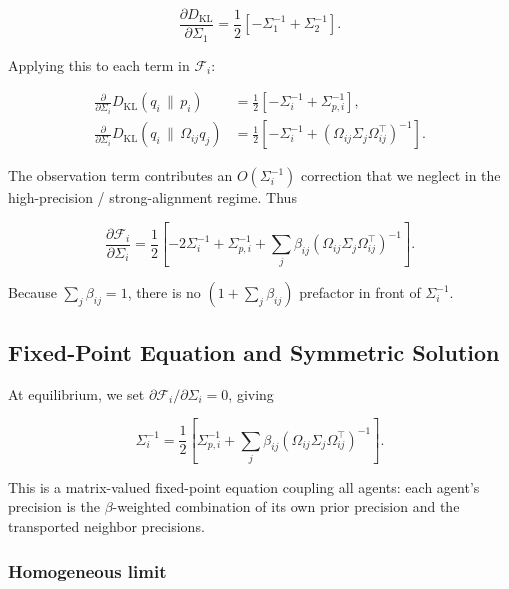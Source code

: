 \documentclass[11pt]{article}
\begin{document}
\begin{equation}
\frac{\partial D_{\mathrm{KL}}}{\partial \Sigma_1}
=\frac{1}{2}\left[
-\Sigma_1^{-1}
+ \Sigma_2^{-1}
\right].
\end{equation}

Applying this to each term in $\mathcal{F}_i$:

\begin{align}
\frac{\partial}{\partial \Sigma_i}
D_{\mathrm{KL}}(q_i \,\|\, p_i)
&=\frac{1}{2}\left[
-\Sigma_i^{-1}
+ \Sigma_{p,i}^{-1}
\right],
\\[6pt]
\frac{\partial}{\partial \Sigma_i}
D_{\mathrm{KL}}(q_i \,\|\, \Omega_{ij} q_j)
&=
\frac{1}{2}\left[
-\Sigma_i^{-1}
+ (\Omega_{ij}\Sigma_j\Omega_{ij}^\top)^{-1}
\right].
\end{align}

The observation term contributes an $O(\Sigma_i^{-1})$ correction that we neglect in the high-precision / strong-alignment regime. Thus

\begin{equation}
\boxed{
\frac{\partial \mathcal{F}_i}{\partial \Sigma_i}
=\frac{1}{2}
\left[
-2 \Sigma_i^{-1}
+ \Sigma_{p,i}^{-1}
+ \sum_j \beta_{ij}
(\Omega_{ij}\Sigma_j\Omega_{ij}^\top)^{-1}
\right].
}
\label{eq:Sigma_gradient_final}
\end{equation}

Because $\sum_j \beta_{ij} = 1$, there is no $(1 + \sum_j \beta_{ij})$ prefactor in front of $\Sigma_i^{-1}$.

\subsection{Fixed-Point Equation and Symmetric Solution}

At equilibrium, we set $\partial \mathcal{F}_i / \partial \Sigma_i = 0$, giving

\begin{equation}
\Sigma_i^{-1}
=\frac{1}{2}
\left[
\Sigma_{p,i}^{-1}
+ \sum_j \beta_{ij}
(\Omega_{ij}\Sigma_j\Omega_{ij}^\top)^{-1}
\right].
\label{eq:sigma_fixed_point_beta}
\end{equation}

This is a matrix-valued fixed-point equation coupling all agents: each agent’s precision is the $\beta$-weighted combination of its own prior precision and the transported neighbor precisions.

\subsubsection{Homogeneous limit}
\end{document}
